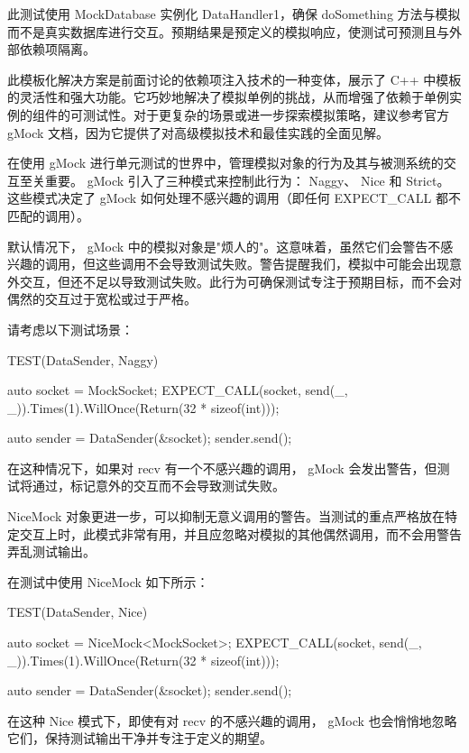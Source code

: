 此测试使用 MockDatabase 实例化 DataHandler1，确保 doSomething 方法与模拟而不是真实数据库进行交互。预期结果是预定义的模拟响应，使测试可预测且与外部依赖项隔离。

此模板化解决方案是前面讨论的依赖项注入技术的一种变体，展示了 C++ 中模板的灵活性和强大功能。它巧妙地解决了模拟单例的挑战，从而增强了依赖于单例实例的组件的可测试性。对于更复杂的场景或进一步探索模拟策略，建议参考官方 gMock 文档，因为它提供了对高级模拟技术和最佳实践的全面见解。


在使用 gMock 进行单元测试的世界中，管理模拟对象的行为及其与被测系统的交互至关重要。 gMock 引入了三种模式来控制此行为： Naggy、 Nice 和 Strict。这些模式决定了 gMock 如何处理不感兴趣的调用（即任何 EXPECT\_CALL 都不匹配的调用）。


默认情况下， gMock 中的模拟对象是"烦人的"。这意味着，虽然它们会警告不感兴趣的调用，但这些调用不会导致测试失败。警告提醒我们，模拟中可能会出现意外交互，但还不足以导致测试失败。此行为可确保测试专注于预期目标，而不会对偶然的交互过于宽松或过于严格。

请考虑以下测试场景：

\begin{cpp}
TEST(DataSender, Naggy) {
    auto socket = MockSocket{};
    EXPECT_CALL(socket, send(_, _)).Times(1).WillOnce(Return(32 * sizeof(int)));

    auto sender = DataSender(&socket);
    sender.send();
}
\end{cpp}

在这种情况下，如果对 recv 有一个不感兴趣的调用， gMock 会发出警告，但测试将通过，标记意外的交互而不会导致测试失败。


NiceMock 对象更进一步，可以抑制无意义调用的警告。当测试的重点严格放在特定交互上时，此模式非常有用，并且应忽略对模拟的其他偶然调用，而不会用警告弄乱测试输出。

在测试中使用 NiceMock 如下所示：

\begin{cpp}
TEST(DataSender, Nice) {
    auto socket = NiceMock<MockSocket>{};
    EXPECT_CALL(socket, send(_, _)).Times(1).WillOnce(Return(32 * sizeof(int)));

    auto sender = DataSender(&socket);
    sender.send();
}
\end{cpp}

在这种 Nice 模式下，即使有对 recv 的不感兴趣的调用， gMock 也会悄悄地忽略它们，保持测试输出干净并专注于定义的期望。

